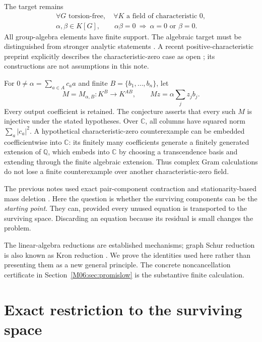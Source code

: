 \documentclass[11pt,a4paper,oneside]{report}
\theoremstyle{definition}
\theoremstyle{remark}
\newcommand{\C}{\mathbb C}
\newcommand{\Q}{\mathbb Q}
\begin{document}
The target remains
\begin{equation}\label{M06:eq:target}
\begin{gathered}
\forall G\text{ torsion-free},\quad
\forall K\text{ a field of characteristic }0,\\
\alpha,\beta\in K[G],\qquad
\alpha\beta=0\ \Longrightarrow\ \alpha=0\text{ or }\beta=0.
\end{gathered}
\end{equation}
All group-algebra elements have finite support. The algebraic target
must be distinguished from stronger analytic statements \cite{B:Linnell}.
A recent positive-characteristic preprint explicitly describes the
characteristic-zero case as open \cite{B:Ivanov}; its constructions are
not assumptions in this note.

For $0\ne\alpha=\sum_{a\in A}c_a a$ and finite
$B=\{b_1,\ldots,b_n\}$, let
\[
M=M_{\alpha,B}:K^B\longrightarrow K^{AB},\qquad
Mz=\alpha\sum_jz_jb_j.
\]
Every output coefficient is retained. The conjecture asserts that
every such $M$ is injective under the stated hypotheses. Over $\C$,
all columns have squared norm $\sum_a|c_a|^2$. A hypothetical
characteristic-zero counterexample can be embedded coefficientwise
into $\C$: its finitely many coefficients generate a finitely
generated extension of $\Q$, which embeds into $\C$ by choosing a
transcendence basis and extending through the finite algebraic
extension. Thus complex Gram calculations do not lose a finite
counterexample over another characteristic-zero field.

The previous notes used exact pair-component contraction and
stationarity-based mass deletion \cite{B:InternalGraph,B:InternalMass}.
Here the question is whether the surviving components can be the
\emph{starting point}. They can, provided every unused equation is
transported to the surviving space. Discarding an equation because
its residual is small changes the problem.

The linear-algebra reductions are established mechanisms; graph
Schur reduction is also known as Kron reduction \cite{B:DB}. We prove
the identities used here rather than presenting them as a new
general principle. The concrete noncancellation certificate in
Section~\ref{M06:sec:promislow} is the substantive finite calculation.

\section{Exact restriction to the surviving space}\label{M06:sec:rows}
\end{document}
